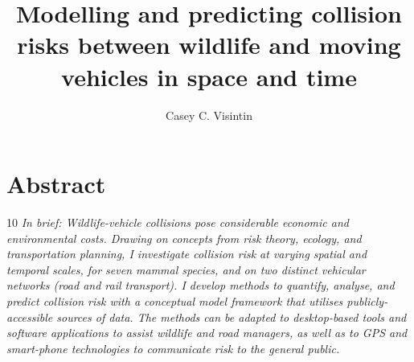 \documentclass[titlesmallcaps,copyrightpage,examinerscopy]{uomthesis}
\begin{document}
\frontmatter
\title{Modelling and predicting collision risks between wildlife and moving vehicles in space and time}
\author{Casey C. Visintin}

\titlepage

\chapter{Abstract}
\begin{localsize-main}{10}
\noindent\textit{In brief: Wildlife-vehicle collisions pose considerable economic and environmental costs. Drawing on concepts from risk theory, ecology, and transportation planning, I investigate collision risk at varying spatial and temporal scales, for seven mammal species, and on two distinct vehicular networks (road and rail transport). I develop methods to quantify, analyse, and predict collision risk with a conceptual model framework that utilises publicly-accessible sources of data. The methods can be adapted to desktop-based tools and software applications to assist wildlife and road managers, as well as to GPS and smart-phone technologies to communicate risk to the general public.}
\end{localsize-main}
\end{document}
